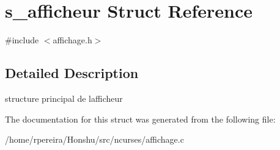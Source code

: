 \hypertarget{structs__afficheur}{}\section{s\+\_\+afficheur Struct Reference}
\label{structs__afficheur}


{\ttfamily \#include $<$affichage.\+h$>$}



\subsection{Detailed Description}
structure principal de l\textquotesingle{}afficheur 

The documentation for this struct was generated from the following file\+:\begin{DoxyCompactItemize}
\item 
/home/rpereira/\+Honshu/src/ncurses/affichage.\+c\end{DoxyCompactItemize}

